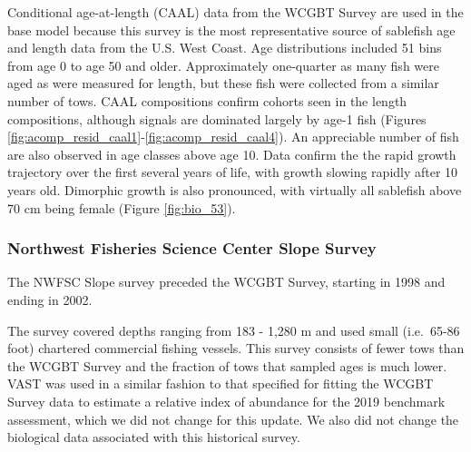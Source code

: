 \documentclass[11pt,
  english,
  a4paper,
]{article}
\begin{document}

Conditional age-at-length (CAAL) data from the WCGBT Survey are used in the base model because this survey is the most representative source of sablefish age and length data from the U.S. West Coast. Age distributions included 51 bins from age 0 to age 50 and older. Approximately one-quarter as many fish were aged as were measured for length, but these fish were collected from a similar number of tows. CAAL compositions confirm cohorts seen in the length compositions, although signals are dominated largely by age-1 fish (Figures \ref{fig:acomp_resid_caal1}-\ref{fig:acomp_resid_caal4}). An appreciable number of fish are also observed in age classes above age 10. Data confirm the the rapid growth trajectory over the first several years of life, with growth slowing rapidly after 10 years old. Dimorphic growth is also pronounced, with virtually all sablefish above 70 cm being female (Figure \ref{fig:bio_53}).

\leavevmode\tagmcend\tagstructend\par


\hypertarget{northwest-fisheries-science-center-slope-survey}{%
\subsubsection{Northwest Fisheries Science Center Slope Survey}\label{northwest-fisheries-science-center-slope-survey}}

\leavevmode\tagmcend\tagstructend

The NWFSC Slope survey preceded the WCGBT Survey, starting in 1998 and ending in 2002.

The survey covered depths ranging from 183 - 1,280 m and used small (i.e.~65-86 foot) chartered commercial fishing vessels. This survey consists of fewer tows than the WCGBT Survey and the fraction of tows that sampled ages is much lower. VAST was used in a similar fashion to that specified for fitting the WCGBT Survey data to estimate a relative index of abundance for the 2019 benchmark assessment, which we did not change for this update. We also did not change the biological data associated with this historical survey.
\end{document}
